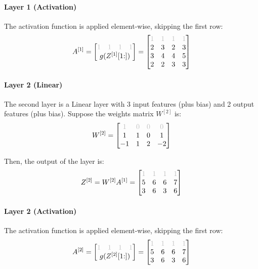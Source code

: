 \paragraph{Layer 1 (Activation)} The activation function is applied element-wise, skipping the first row:
\begin{equation*}
    A^{[1]} = \mqty[
        \mqty{\color{lightgray} 1 & \color{lightgray} 1 & \color{lightgray} 1 & \color{lightgray} 1} \\
        g(Z^{[1]}[1\hspace{-0.6ex}:])
    ] = \mqty[
        \color{lightgray} 1 & \color{lightgray} 1 & \color{lightgray} 1 & \color{lightgray} 1 \\
        2 & 3 & 2 & 3 \\
        3 & 4 & 4 & 5 \\
        2 & 2 & 3 & 3
    ]
\end{equation*}

\paragraph{Layer 2 (Linear)} The second layer is a Linear layer with 3 input features (plus bias) and 2 output features (plus bias). Suppose the weights matrix $W^{[2]}$ is:
\begin{equation*}
    W^{[2]} = \mqty[
        \color{lightgray} 1 & \color{lightgray} 0 & \color{lightgray} 0 & \color{lightgray} 0\\
        1 & 1 & 0 & 1\\
        -1 & 1 & 2 & -2
    ]
\end{equation*}

Then, the output of the layer is:
\begin{equation*}
    Z^{[2]} = W^{[2]} A^{[1]} = \mqty[
        \color{lightgray} 1 & \color{lightgray} 1 & \color{lightgray} 1 & \color{lightgray} 1 \\
        5 & 6 & 6 & 7 \\
        3 & 6 & 3 & 6
    ]
\end{equation*}

\paragraph{Layer 2 (Activation)} The activation function is applied element-wise, skipping the first row:
\begin{equation*}
    A^{[2]} = \mqty[
        \mqty{\color{lightgray} 1 & \color{lightgray} 1 & \color{lightgray} 1 & \color{lightgray} 1} \\
        g(Z^{[2]}[1\hspace{-0.6ex}:])
    ] = \mqty[
        \color{lightgray} 1 & \color{lightgray} 1 & \color{lightgray} 1 & \color{lightgray} 1 \\
        5 & 6 & 6 & 7 \\
        3 & 6 & 3 & 6
    ]
\end{equation*}

